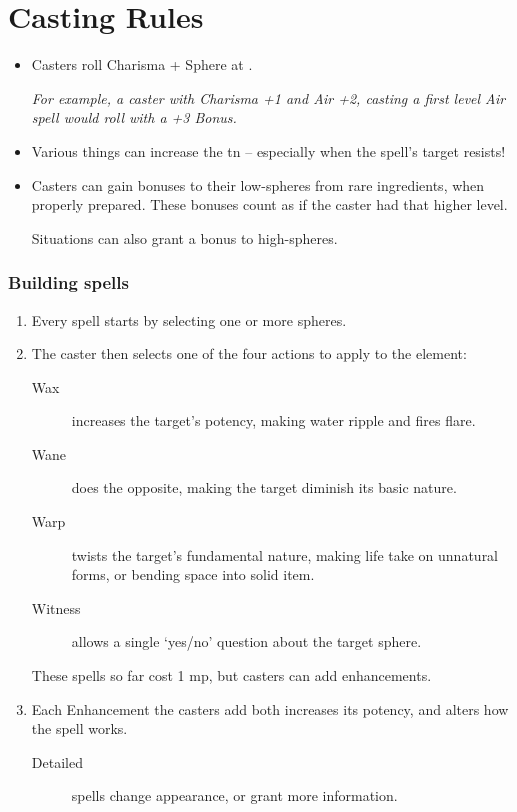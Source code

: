 
\chapter{Casting Rules}

\begin{multicols}{2}

\begin{itemize}
  \item
  Casters roll Charisma + Sphere at \tn[7].

  \textit{For example, a caster with Charisma +1 and Air +2, casting a first level Air spell would roll with a +3 Bonus.}
  \item
  Various things can increase the \gls{tn} -- especially when the spell's target resists!
  \item
  Casters can gain bonuses to their low-spheres from rare ingredients, when properly prepared.
  These bonuses count as if the caster had that higher level.

  Situations can also grant a bonus to high-spheres.
\end{itemize}

\subsection{Building spells}

\begin{enumerate}
  \item
  Every spell starts by selecting one or more spheres.
  \item
  The caster then selects one of the four actions to apply to the element:
  \begin{description}
    \item[Wax]
    increases the target's potency, making water ripple and fires flare.
    \item[Wane]
    does the opposite, making the target diminish its basic nature.
    \item[Warp]
    twists the target's fundamental nature, making life take on unnatural forms, or bending space into solid item.
    \item[Witness]
    allows a single `yes/no' question about the target sphere.
  \end{description}
  These spells so far cost 1 \gls{mp}, but casters can add enhancements.
  \item
  Each Enhancement the casters add both increases its potency, and alters how the spell works.
  \begin{description}
    \item[Detailed]
    spells change appearance, or grant more information.


\end{description}
\end{enumerate}
\end{multicols}
